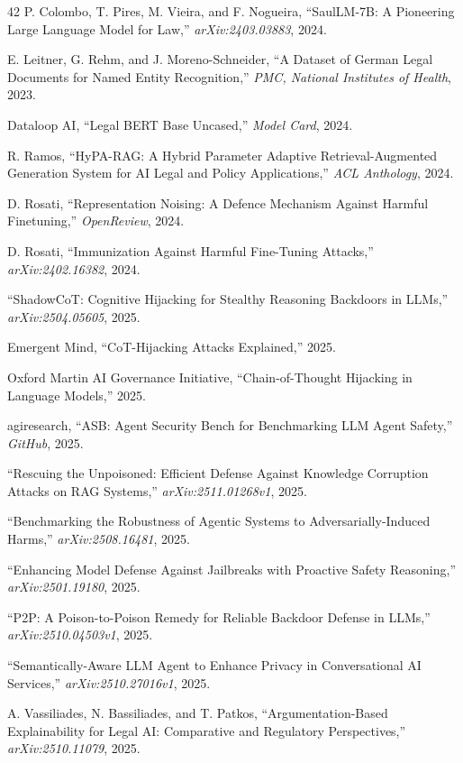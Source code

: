 \documentclass[journal,10pt]{IEEEtran}
\begin{document}
\begin{thebibliography}{42}
P. Colombo, T. Pires, M. Vieira, and F. Nogueira, ``SaulLM-7B: A Pioneering Large Language Model for Law,'' \textit{arXiv:2403.03883}, 2024.

E. Leitner, G. Rehm, and J. Moreno-Schneider, ``A Dataset of German Legal Documents for Named Entity Recognition,'' \textit{PMC, National Institutes of Health}, 2023.

Dataloop AI, ``Legal BERT Base Uncased,'' \textit{Model Card}, 2024.

R. Ramos, ``HyPA-RAG: A Hybrid Parameter Adaptive Retrieval-Augmented Generation System for AI Legal and Policy Applications,'' \textit{ACL Anthology}, 2024.

D. Rosati, ``Representation Noising: A Defence Mechanism Against Harmful Finetuning,'' \textit{OpenReview}, 2024.

D. Rosati, ``Immunization Against Harmful Fine-Tuning Attacks,'' \textit{arXiv:2402.16382}, 2024.

``ShadowCoT: Cognitive Hijacking for Stealthy Reasoning Backdoors in LLMs,'' \textit{arXiv:2504.05605}, 2025.

Emergent Mind, ``CoT-Hijacking Attacks Explained,'' 2025.

Oxford Martin AI Governance Initiative, ``Chain-of-Thought Hijacking in Language Models,'' 2025.

agiresearch, ``ASB: Agent Security Bench for Benchmarking LLM Agent Safety,'' \textit{GitHub}, 2025.

``Rescuing the Unpoisoned: Efficient Defense Against Knowledge Corruption Attacks on RAG Systems,'' \textit{arXiv:2511.01268v1}, 2025.

``Benchmarking the Robustness of Agentic Systems to Adversarially-Induced Harms,'' \textit{arXiv:2508.16481}, 2025.

``Enhancing Model Defense Against Jailbreaks with Proactive Safety Reasoning,'' \textit{arXiv:2501.19180}, 2025.

``P2P: A Poison-to-Poison Remedy for Reliable Backdoor Defense in LLMs,'' \textit{arXiv:2510.04503v1}, 2025.

``Semantically-Aware LLM Agent to Enhance Privacy in Conversational AI Services,'' \textit{arXiv:2510.27016v1}, 2025.

A. Vassiliades, N. Bassiliades, and T. Patkos, ``Argumentation-Based Explainability for Legal AI: Comparative and Regulatory Perspectives,'' \textit{arXiv:2510.11079}, 2025.

\end{thebibliography}
\end{document}
